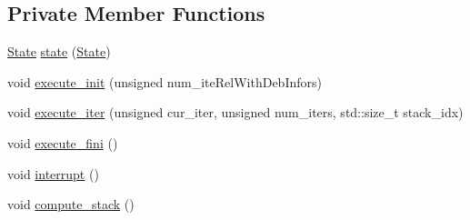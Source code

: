\subsection*{Private Member Functions}
\begin{DoxyCompactItemize}
\item 
\hyperlink{classecto_1_1scheduler_a6b063d1c4bb9dad58d7ace61946b1200}{State} \hyperlink{classecto_1_1scheduler_a04cb7ea1040fcb02f5c843ca33ffa1a6}{state} (\hyperlink{classecto_1_1scheduler_a6b063d1c4bb9dad58d7ace61946b1200}{State})
\item 
void \hyperlink{classecto_1_1scheduler_adc21b65d6b046032648161c16ca89f77}{execute\+\_\+init} (unsigned num\+\_\+ite\+Rel\+With\+Deb\+Infors)
\item 
void \hyperlink{classecto_1_1scheduler_ae96db9aa735b4aec8eda6c1ea5616b95}{execute\+\_\+iter} (unsigned cur\+\_\+iter, unsigned num\+\_\+iters, std\+::size\+\_\+t stack\+\_\+idx)
\item 
void \hyperlink{classecto_1_1scheduler_abab4de26974143a076ac532ffac4f67f}{execute\+\_\+fini} ()
\item 
void \hyperlink{classecto_1_1scheduler_ae803a977a35883a6a0b8f83e7ba63d3c}{interrupt} ()
\item 
void \hyperlink{classecto_1_1scheduler_ad922a0a31e48a09ae6b6a95a4a1a20e5}{compute\+\_\+stack} ()
\end{DoxyCompactItemize}
